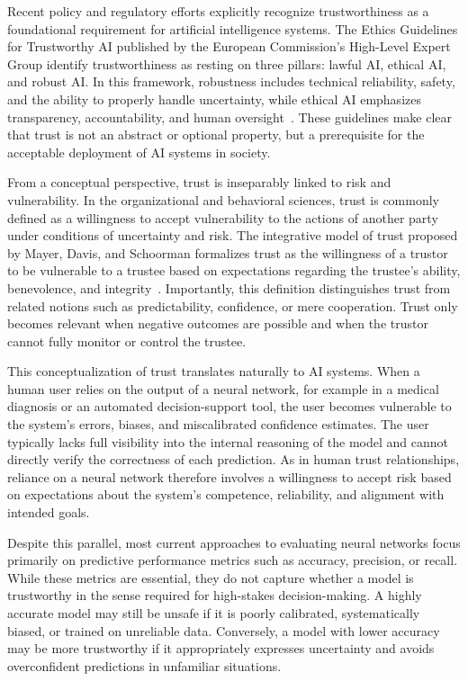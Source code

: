 Recent policy and regulatory efforts explicitly recognize trustworthiness as a foundational requirement for artificial intelligence systems. The Ethics Guidelines for Trustworthy AI published by the European Commission’s High-Level Expert Group identify trustworthiness as resting on three pillars: lawful AI, ethical AI, and robust AI. In this framework, robustness includes technical reliability, safety, and the ability to properly handle uncertainty, while ethical AI emphasizes transparency, accountability, and human oversight~\cite{ec2019ethics}. These guidelines make clear that trust is not an abstract or optional property, but a prerequisite for the acceptable deployment of AI systems in society.

From a conceptual perspective, trust is inseparably linked to risk and vulnerability. In the organizational and behavioral sciences, trust is commonly defined as a willingness to accept vulnerability to the actions of another party under conditions of uncertainty and risk. The integrative model of trust proposed by Mayer, Davis, and Schoorman formalizes trust as the willingness of a trustor to be vulnerable to a trustee based on expectations regarding the trustee’s ability, benevolence, and integrity~\cite{55a601e8-f397-31d9-a222-5b5dd8d0bb15}. Importantly, this definition distinguishes trust from related notions such as predictability, confidence, or mere cooperation. Trust only becomes relevant when negative outcomes are possible and when the trustor cannot fully monitor or control the trustee.

This conceptualization of trust translates naturally to AI systems. When a human user relies on the output of a neural network, for example in a medical diagnosis or an automated decision-support tool, the user becomes vulnerable to the system’s errors, biases, and miscalibrated confidence estimates. The user typically lacks full visibility into the internal reasoning of the model and cannot directly verify the correctness of each prediction. As in human trust relationships, reliance on a neural network therefore involves a willingness to accept risk based on expectations about the system’s competence, reliability, and alignment with intended goals.

Despite this parallel, most current approaches to evaluating neural networks focus primarily on predictive performance metrics such as accuracy, precision, or recall. While these metrics are essential, they do not capture whether a model is trustworthy in the sense required for high-stakes decision-making. A highly accurate model may still be unsafe if it is poorly calibrated, systematically biased, or trained on unreliable data. Conversely, a model with lower accuracy may be more trustworthy if it appropriately expresses uncertainty and avoids overconfident predictions in unfamiliar situations.


